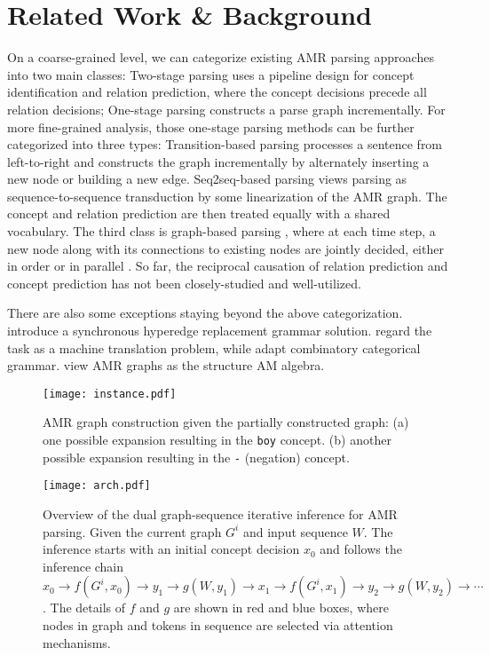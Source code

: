 \documentclass[11pt,a4paper]{article}
\begin{document}
	\section{Related Work \& Background}
	On a coarse-grained level, we can categorize existing AMR parsing approaches into two main classes: Two-stage parsing \cite{flanigan2014discriminative, lyu2018amr,zhang-etal-2019-amr} uses a pipeline design for concept identification and relation prediction, where the concept decisions precede all relation decisions; One-stage parsing constructs a parse graph incrementally. For more fine-grained analysis, those one-stage parsing methods can be further categorized into three types: Transition-based parsing \cite{wang2016camr,damonte2016incremental,ballesteros2017amr,peng-etal-2017-addressing,guo2018better,liu2018amr,wang2017getting,naseem-etal-2019-rewarding} processes a sentence from left-to-right and constructs the graph incrementally by alternately inserting a new node or building a new edge. Seq2seq-based parsing \cite{barzdins2016riga,konstas2017neural,van2017neural,peng-etal-2018-sequence} views parsing as sequence-to-sequence transduction by some linearization of the AMR graph. The concept and relation prediction are then treated equally with a shared vocabulary. The third class is graph-based parsing \cite{cai-lam-2019-core,zhang-etal-2019-broad}, where at each time step, a new node along with its connections to existing nodes are jointly decided, either in order \cite{cai-lam-2019-core} or in parallel \cite{zhang-etal-2019-broad}. So far, the reciprocal causation of relation prediction and concept prediction has not been closely-studied and well-utilized.
	
	There are also some exceptions staying beyond the above categorization.   introduce a synchronous hyperedge replacement grammar solution.  regard the task as a machine translation problem, while  adapt combinatory categorical grammar.  view AMR graphs as the structure AM algebra.
	\begin{figure}[t]
		\centering
		\texttt{[image: instance.pdf]}
		\caption{AMR graph construction given the partially constructed graph: (a) one possible expansion resulting in the \texttt{boy} concept. (b) another possible expansion resulting in the \texttt{-} (negation) concept.}
		\label{example}
	\end{figure}
	\begin{figure*}[t]
		\centering
		\texttt{[image: arch.pdf]}
		\caption{Overview of the dual graph-sequence iterative inference for AMR parsing. Given the current graph $G^i$ and input sequence $W$. The inference starts with an initial concept decision $x_0$ and follows the inference chain $x_0 \rightarrow f(G^i, x_0) \rightarrow y_1 \rightarrow g(W, y_1) \rightarrow x_1 \rightarrow f(G^i, x_1) \rightarrow y_2 \rightarrow g(W, y_2) \rightarrow \cdots$. The details of $f$ and $g$ are shown in red and blue boxes, where nodes in graph and tokens in sequence are selected via attention mechanisms.}
		\label{arch}
	\end{figure*}
\end{document}
